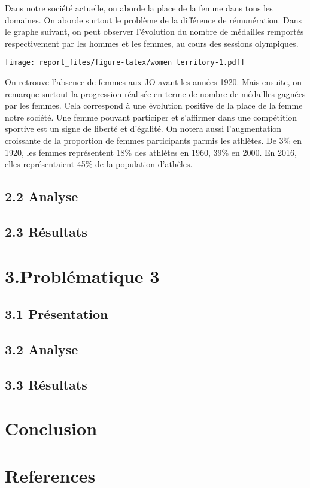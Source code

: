 \documentclass[11pt,]{article}
\begin{document}
Dans notre société actuelle, on aborde la place de la femme dans tous
les domaines. On aborde surtout le problème de la différence de
rémunération. Dans le graphe suivant, on peut observer l'évolution du
nombre de médailles remportés respectivement par les hommes et les
femmes, au cours des sessions olympiques.

\texttt{[image: report\_files/figure-latex/women territory-1.pdf]}

On retrouve l'absence de femmes aux JO avant les années 1920. Mais
ensuite, on remarque surtout la progression réalisée en terme de nombre
de médailles gagnées par les femmes. Cela correspond à une évolution
positive de la place de la femme notre société. Une femme pouvant
participer et s'affirmer dans une compétition sportive est un signe de
liberté et d'égalité. On notera aussi l'augmentation croissante de la
proportion de femmes participants parmis les athlètes. De 3\% en 1920,
les femmes représentent 18\% des athlètes en 1960, 39\% en 2000. En
2016, elles représentaient 45\% de la population d'athèles.

\subsection{2.2 Analyse}\label{analyse}

\subsection{2.3 Résultats}\label{resultats}

\section{3.Problématique 3}\label{problematique-3}

\subsection{3.1 Présentation}\label{presentation-1}

\subsection{3.2 Analyse}\label{analyse-1}

\subsection{3.3 Résultats}\label{resultats-1}

\section{Conclusion}\label{conclusion}

\section{References}\label{references}
\end{document}
